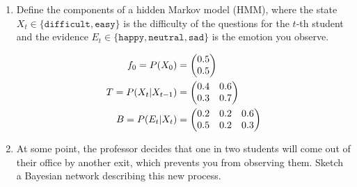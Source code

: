 \documentclass[11pt, a4paper]{article}
\begin{document}
\begin{enumerate}
    \item Define the components of a hidden Markov model (HMM), where the state $X_t \in \{\texttt{difficult}, \texttt{easy}\}$ is the difficulty of the questions for the $t$-th student and the evidence $E_t \in \{\texttt{happy}, \texttt{neutral}, \texttt{sad}\}$ is the emotion you observe.
    \begin{solution}
        \begin{align*}
            f_0 = P(X_0) & = \begin{pmatrix}0.5 \\ 0.5\end{pmatrix} \\
            T = P(X_t | X_{t-1}) & = \begin{pmatrix}0.4 & 0.6 \\ 0.3 & 0.7\end{pmatrix} \\
            B = P(E_t | X_t) & = \begin{pmatrix}0.2 & 0.2 & 0.6 \\ 0.5 & 0.2 & 0.3\end{pmatrix}
        \end{align*}
    \end{solution}

    \item At some point, the professor decides that one in two students will come out of their office by another exit, which prevents you from observing them. Sketch a Bayesian network describing this new process.%

    \begin{solution}
    \begin{figure}[h]
        \centering
    \end{figure}
    \end{solution}


\end{enumerate}
\end{document}
